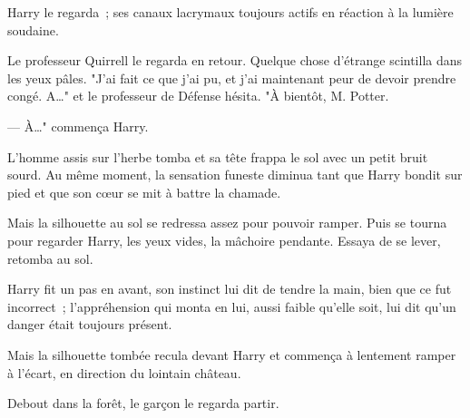 Harry le regarda~; ses canaux lacrymaux toujours actifs en réaction à la lumière soudaine.

Le professeur Quirrell le regarda en retour. Quelque chose d'étrange scintilla dans les yeux pâles. "J'ai fait ce que j'ai pu, et j'ai maintenant peur de devoir prendre congé. A…" et le professeur de Défense hésita. "À bientôt, M. Potter.

--- À…" commença Harry.

L'homme assis sur l'herbe tomba et sa tête frappa le sol avec un petit bruit sourd. Au même moment, la sensation funeste diminua tant que Harry bondit sur pied et que son cœur se mit à battre la chamade.

Mais la silhouette au sol se redressa assez pour pouvoir ramper. Puis se tourna pour regarder Harry, les yeux vides, la mâchoire pendante. Essaya de se lever, retomba au sol.

Harry fit un pas en avant, son instinct lui dit de tendre la main, bien que ce fut incorrect~; l'appréhension qui monta en lui, aussi faible qu'elle soit, lui dit qu'un danger était toujours présent.

Mais la silhouette tombée recula devant Harry et commença à lentement ramper à l'écart, en direction du lointain château.

Debout dans la forêt, le garçon le regarda partir. 

